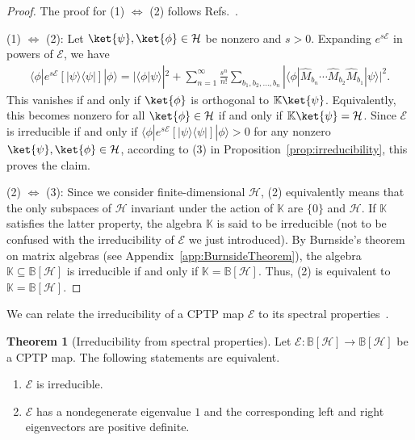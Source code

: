 \documentclass[preprint,pteplogo]{ptephy_v2}%
\numberwithin{equation}{section}
\theoremstyle{definition}
\newtheorem{theorem}{Theorem}
\newcommand{\mc}[1]{\mathcal{#1}}
\newcommand{\mbb}[1]{\mathbb{#1}}
\begin{document}
\begin{proof}
The proof for (1) $\Leftrightarrow$ (2) follows Refs.~\cite{schrader2000perron, jaksic2014entropic}.

(1) $\Leftrightarrow$ (2): 
Let $\ket{\psi}, \ket{\phi} \in \mc{H}$ be nonzero and $s>0$. 
Expanding $e^{s\mc{E}}$ in powers of $\mc{E}$, we have
\begin{align}
\langle \phi | e^{s\mc{E}}[|\psi \rangle \langle \psi|] | \phi \rangle = |\langle \phi | \psi \rangle|^2 + \sum_{n=1}^\infty \frac{s^n}{n!} \sum_{b_1, b_2, \ldots, b_n} | \langle \phi | \hat{M}_{b_n} \cdots \hat{M}_{b_2} \hat{M}_{b_1} | \psi \rangle |^2.
\end{align}
This vanishes if and only if $\ket{\phi}$ is orthogonal to $\mbb{K} \ket{\psi}$.
Equivalently, this becomes nonzero for all $\ket{\phi}\in\mathcal{H}$ if and only if $\mbb{K} \ket{\psi} = \mc{H}$.
Since $\mc{E}$ is irreducible if and only if $\langle \phi | e^{s\mc{E}}[|\psi \rangle \langle \psi|] | \phi \rangle > 0$ for any nonzero $\ket{\psi}, \ket{\phi} \in \mc{H}$, according to (3) in Proposition~\ref{prop:irreducibility}, this proves the claim.

(2) $\Leftrightarrow$ (3): 
Since we consider finite-dimensional $\mc{H}$, (2) equivalently means that the only subspaces of $\mc{H}$ invariant under the action of $\mbb{K}$ are $\{ 0 \}$ and $\mc{H}$.
If $\mbb{K}$ satisfies the latter property, the algebra $\mbb{K}$ is said to be irreducible (not to be confused with the irreducibility of $\mc{E}$ we just introduced). 
By Burnside's theorem on matrix algebras (see Appendix~\ref{app:BurnsideTheorem}), the algebra $\mbb{K} \subseteq \mbb{B}[\mc{H}]$ is irreducible if and only if $\mbb{K} = \mbb{B}[\mc{H}]$.
Thus, (2) is equivalent to $\mbb{K} = \mbb{B}[\mc{H}]$.
\end{proof}

We can relate the irreducibility of a CPTP map $\mc{E}$ to its spectral properties~\cite{evans1978spectral, wolf2012quantum}.

\begin{theorem}[Irreducibility from spectral properties]
\label{thm:IrreducibilityBySpectrum}
Let $\mc{E}: \mbb{B}[\mc{H}] \to \mbb{B}[\mc{H}]$ be a CPTP map.
The following statements are equivalent.
\begin{enumerate}
\item $\mc{E}$ is irreducible.
\item $\mc{E}$ has a nondegenerate eigenvalue $1$ and the corresponding left and right eigenvectors are positive definite.
\end{enumerate}
\end{theorem}
\end{document}
